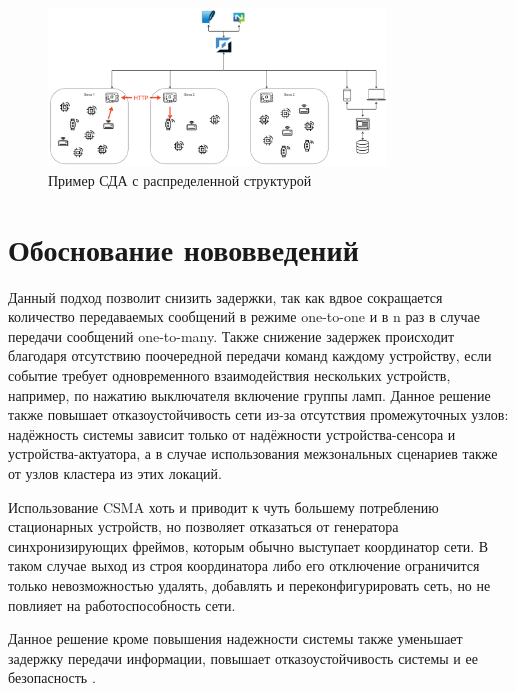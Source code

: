 \documentclass[14pt, a4paper]{extreport}
\begin{document}
\begin{figure}[ht]
    \centering
    \includegraphics[width=0.8\textwidth]{images/GlobalSystemDesing.png}
    \caption{Пример СДА с распределенной структурой}
    \label{fig:GlobalSystemDesing}
\end{figure}

\section{Обоснование нововведений}

Данный подход позволит снизить задержки, так как вдвое сокращается количество передаваемых сообщений в режиме one-to-one и в n раз в случае передачи сообщений one-to-many. Также
снижение задержек происходит благодаря отсутствию поочередной передачи команд каждому устройству, если событие требует одновременного взаимодействия нескольких
устройств, например, по нажатию выключателя включение группы ламп. Данное решение также повышает отказоустойчивость сети из-за отсутствия промежуточных узлов: надёжность системы
зависит только от надёжности устройства-сенсора и устройства-актуатора, а в случае использования межзональных сценариев также от узлов кластера из этих локаций.

Использование CSMA хоть и приводит к чуть большему потреблению стационарных устройств, но позволяет отказаться от генератора синхронизирующих фреймов, которым обычно выступает
координатор сети. В таком случае выход из строя координатора либо его отключение ограничится только невозможностью удалять, добавлять и переконфигурировать сеть, но не повлияет
на работоспособность сети.

Данное решение кроме повышения надежности системы также уменьшает задержку передачи информации, повышает отказоустойчивость системы и ее безопасность \cite{SecuritySmartHome, SecuritySmartHome2}.
\end{document}
